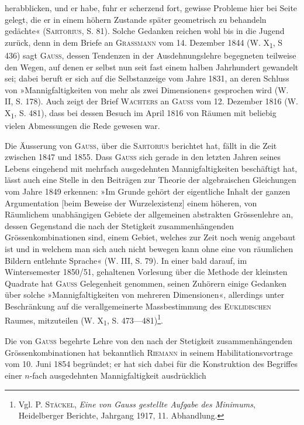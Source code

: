 herabblicken, und er habe, fuhr er scherzend fort, gewisse Probleme hier bei
Seite gelegt, die er in einem höhern Zustande später geometrisch zu behandeln
gedächte« (\textsc{Sartorius}, S. 81). Solche Gedanken reichen wohl bis in die Jugend
zurück, denn in dem Briefe an \textsc{Grassmann} vom 14. Dezember 1844 (W. X\textsubscript{1},
S 436) sagt \textsc{Gauss}, dessen Tendenzen in der Ausdehnungslehre begegneten
teilweise den Wegen, auf denen er selbst nun seit fast einem halben Jahrhundert
gewandelt sei; dabei beruft er sich auf die Selbstanzeige vom Jahre
1831, an deren Schluss von »Mannigfaltigkeiten von mehr als zwei Dimensionen«
gesprochen wird (W. II, S. 178). Auch zeigt der Brief \textsc{Wachters} an \textsc{Gauss}
vom 12. Dezember 1816 (W. X\textsubscript{1}, S. 481), dass bei dessen Besuch im April
1816 von Räumen mit beliebig vielen Abmessungen die Rede gewesen war.
\par
Die Äusserung von \textsc{Gauss}, über die \textsc{Sartorius} berichtet hat, fällt in die
Zeit zwischen 1847 und 1855. Dass \textsc{Gauss} sich gerade in den letzten Jahren
seines Lebens eingehend mit mehrfach ausgedehnten Mannigfaltigkeiten beschäftigt
hat, lässt auch eine Stelle in den Beiträgen zur Theorie der algebraischen
Gleichungen vom Jahre 1849 erkennen: »Im Grunde gehört der
eigentliche Inhalt der ganzen Argumentation [beim Beweise der Wurzelexistenz]
einem höheren, von Räumlichem unabhängigen Gebiete der allgemeinen
abstrakten Grössenlehre an, dessen Gegenstand die nach der Stetigkeit
zusammenhängenden Grössenkombinationen sind, einem Gebiet, welches zur
Zeit noch wenig angebaut ist und in welchem man sich auch nicht bewegen
kann ohne eine von räumlichen Bildern entlehnte Sprache« (W. III, S. 79).
In einer bald darauf, im Wintersemester 1850/51, gehaltenen Vorlesung über
die Methode der kleinsten Quadrate hat \textsc{Gauss} Gelegenheit genommen, seinen
Zuhörern einige Gedanken über solche »Mannigfaltigkeiten von mehreren
Dimensionen«, allerdings unter Beschränkung auf die verallgemeinerte Massbestimmung
des \textsc{Euklidischen} Raumes, mitzuteilen (W. X\textsubscript{1}, S. 473—481)\footnote{Vgl. \textsc{P. Stäckel}, \textit{Eine von Gauss gestellte Aufgabe des Minimums}, Heidelberger Berichte, Jahrgang 1917, 11. Abhandlung.}.
\par
Die von \textsc{Gauss} begehrte Lehre von den nach der Stetigkeit zusammenhängenden
Grössenkombinationen hat bekanntlich \textsc{Riemann} in seinem Habilitationsvortrage
vom 10. Juni 1854 begründet; er hat sich dabei für die Konstruktion
des Begriffes einer \(n\)-fach ausgedehnten Mannigfaltigkeit ausdrücklich
